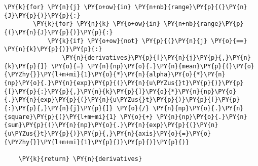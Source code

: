 \begin{tcolorbox}[breakable, size=fbox, boxrule=1pt, pad at break*=1mm,colback=cellbackground, colframe=cellborder]
\begin{Verbatim}[commandchars=\\\{\}]
    \PY{k}{for} \PY{n}{j} \PY{o+ow}{in} \PY{n+nb}{range}\PY{p}{(}\PY{n}{J}\PY{p}{)}\PY{p}{:}
        \PY{k}{for} \PY{n}{k} \PY{o+ow}{in} \PY{n+nb}{range}\PY{p}{(}\PY{n}{J}\PY{p}{)}\PY{p}{:}
            \PY{k}{if} \PY{o+ow}{not} \PY{p}{(}\PY{n}{j} \PY{o}{==} \PY{n}{k}\PY{p}{)}\PY{p}{:}
                \PY{n}{derivatives}\PY{p}{[}\PY{n}{j}\PY{p}{,}\PY{n}{k}\PY{p}{]} \PY{o}{=} \PY{n}{np}\PY{o}{.}\PY{n}{mean}\PY{p}{(}\PY{o}{\PYZhy{}}\PY{l+m+mi}{1}\PY{o}{*}\PY{n}{alpha}\PY{o}{*}\PY{n}{np}\PY{o}{.}\PY{n}{exp}\PY{p}{(}\PY{n}{u\PYZus{}t}\PY{p}{)}\PY{p}{[}\PY{p}{:}\PY{p}{,}\PY{n}{k}\PY{p}{]}\PY{o}{*}\PY{n}{np}\PY{o}{.}\PY{n}{exp}\PY{p}{(}\PY{n}{u\PYZus{}t}\PY{p}{)}\PY{p}{[}\PY{p}{:}\PY{p}{,}\PY{n}{j}\PY{p}{]} \PY{o}{/} \PY{n}{np}\PY{o}{.}\PY{n}{square}\PY{p}{(}\PY{l+m+mi}{1} \PY{o}{+} \PY{n}{np}\PY{o}{.}\PY{n}{sum}\PY{p}{(}\PY{n}{np}\PY{o}{.}\PY{n}{exp}\PY{p}{(}\PY{n}{u\PYZus{}t}\PY{p}{)}\PY{p}{,}\PY{n}{axis}\PY{o}{=}\PY{o}{\PYZhy{}}\PY{l+m+mi}{1}\PY{p}{)}\PY{p}{)}\PY{p}{)}

    \PY{k}{return} \PY{n}{derivatives}
\end{Verbatim}
\end{tcolorbox}

